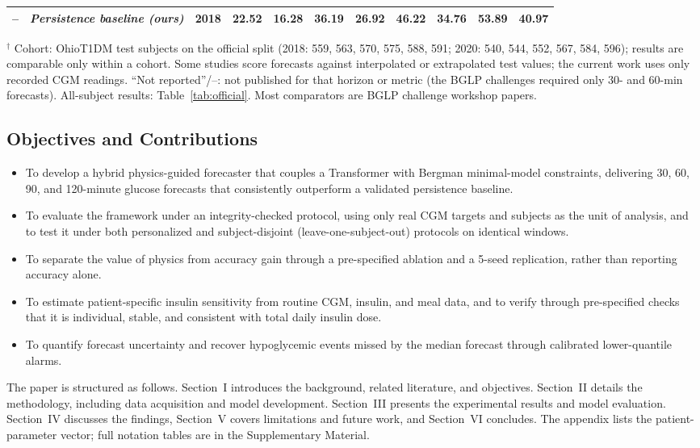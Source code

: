 \documentclass[journal]{IEEEtran}
\begin{document}
\begin{table}[t]
{\begin{tabular}{l>{\raggedright\arraybackslash}p{2.6cm}crrrrrrrr}
-- & \emph{Persistence baseline (ours)} & 2018 & 22.52 & 16.28 & 36.19 & 26.92 & 46.22 & 34.76 & 53.89 & 40.97 \\
\bottomrule
\end{tabular}%
}
\vspace{2pt}
\raggedright\footnotesize
$^{\dagger}$ Cohort: OhioT1DM test subjects on the official split (2018: 559, 563, 570, 575, 588, 591; 2020: 540, 544, 552, 567, 584, 596); results are comparable only within a cohort. Some studies score forecasts against interpolated or extrapolated test values; the current work uses only recorded CGM readings. ``Not reported''/--: not published for that horizon or metric (the BGLP challenges required only 30- and 60-min forecasts). All-subject results: Table~\ref{tab:official}. Most comparators are BGLP challenge workshop papers.
\end{table}
 


\subsection{Objectives and Contributions}
\begin{itemize}
\sloppy
\item To develop a hybrid physics-guided forecaster that couples a Transformer with Bergman minimal-model constraints, delivering 30, 60, 90, and 120-minute glucose forecasts that consistently outperform a validated persistence baseline.
\item To evaluate the framework under an integrity-checked protocol, using only real CGM targets and subjects as the unit of analysis, and to test it under both personalized and subject-disjoint (leave-one-subject-out) protocols on identical windows.
\item To separate the value of physics from accuracy gain through a pre-specified ablation and a 5-seed replication, rather than reporting accuracy alone.
\item To estimate patient-specific insulin sensitivity from routine CGM, insulin, and meal data, and to verify through pre-specified checks that it is individual, stable, and consistent with total daily insulin dose.
\item To quantify forecast uncertainty and recover hypoglycemic events missed by the median forecast through calibrated lower-quantile alarms.
\end{itemize}

The paper is structured as follows. Section~I introduces the background, related literature, and objectives. Section~II details the methodology, including data acquisition and model development. Section~III presents the experimental results and model evaluation. Section~IV discusses the findings, Section~V covers limitations and future work, and Section~VI concludes. The appendix lists the patient-parameter vector; full notation tables are in the Supplementary Material.
\end{document}

